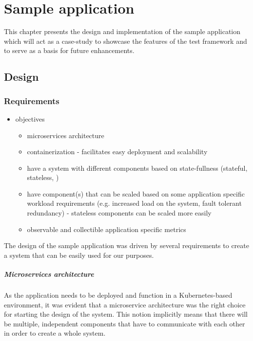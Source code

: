 \chapter{Sample application}

This chapter presents the design and implementation of the sample application which will act as a case-study to showcase the features of the test framework and to serve as a basis for future enhancements. 


\section{Design}

\subsection{Requirements}

\begin{itemize}
	\item objectives
	\begin{itemize}
		\item microservices architecture
		\item containerization - facilitates easy deployment and scalability
		\item have a system with different components based on state-fullness (stateful, stateless, )
		\item have component(s) that can be scaled based on some application specific workload requirements (e.g. increased load on the system, fault tolerant redundancy) - stateless components can be scaled more easily
		\item observable and collectible application specific metrics
	\end{itemize}
\end{itemize}

The design of the sample application was driven by several requirements to create a system that can be easily used for our purposes.

\paragraph{Microservices architecture}As the application needs to be deployed and function in a Kubernetes-based environment, it was evident that a microservice architecture was the right choice for starting the design of the system. This notion implicitly means that there will be multiple, independent components that have to communicate with each other in order to create a whole system.

